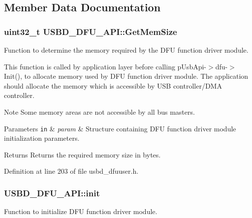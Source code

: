 \subsection{Member Data Documentation}
\subsubsection[{\texorpdfstring{Get\+Mem\+Size}{GetMemSize}}]{\setlength{\rightskip}{0pt plus 5cm}uint32\+\_\+t U\+S\+B\+D\+\_\+\+D\+F\+U\+\_\+\+A\+P\+I\+::\+Get\+Mem\+Size}\hypertarget{structUSBD__DFU__API_a91b64bb4209cfa9e3254bd3ba8963cdc}{}\label{structUSBD__DFU__API_a91b64bb4209cfa9e3254bd3ba8963cdc}
Function to determine the memory required by the D\+FU function driver module.

This function is called by application layer before calling p\+Usb\+Api-\/$>$dfu-\/$>$Init(), to allocate memory used by D\+FU function driver module. The application should allocate the memory which is accessible by U\+SB controller/\+D\+MA controller. \begin{DoxyNote}{Note}
Some memory areas are not accessible by all bus masters.
\end{DoxyNote}

\begin{DoxyParams}[1]{Parameters}
\mbox{\tt in}  & {\em param} & Structure containing D\+FU function driver module initialization parameters. \\
\hline
\end{DoxyParams}
\begin{DoxyReturn}{Returns}
Returns the required memory size in bytes. 
\end{DoxyReturn}


Definition at line 203 of file usbd\+\_\+dfuuser.\+h.

\subsubsection[{\texorpdfstring{init}{init}}]{ U\+S\+B\+D\+\_\+\+D\+F\+U\+\_\+\+A\+P\+I\+::init}\hypertarget{structUSBD__DFU__API_a88ef3b78fca066f41f8020d39163e1e8}{}\label{structUSBD__DFU__API_a88ef3b78fca066f41f8020d39163e1e8}
Function to initialize D\+FU function driver module.

